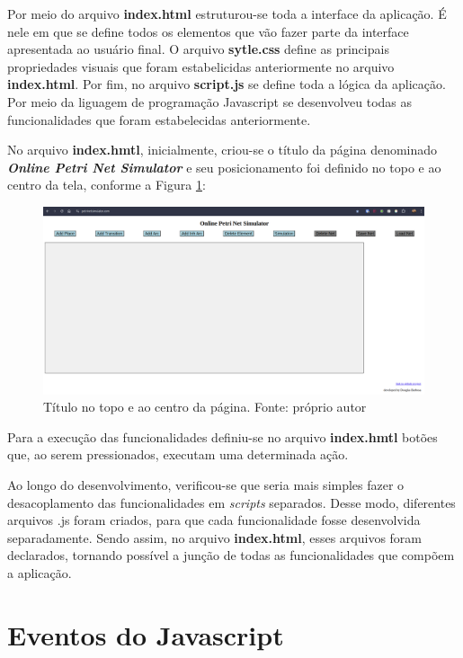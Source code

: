 \documentclass[
	12pt,				%
	openright,			%
	oneside,			%
	a4paper,			%
	english,			%
	brazil				%
	]{abntex2}
\theoremstyle{doispontos}
\begin{document}
Por meio do arquivo \textbf{index.html} estruturou-se toda a interface da aplicação. É nele em que se define todos os elementos que vão fazer parte da interface apresentada ao usuário final. O arquivo \textbf{sytle.css} define as principais propriedades visuais que foram estabelicidas anteriormente no arquivo \textbf{index.html}. Por fim, no arquivo \textbf{script.js} se define toda a lógica da aplicação. Por meio da liguagem de programação Javascript se desenvolveu todas as funcionalidades que foram estabelecidas anteriormente. 

No arquivo \textbf{index.hmtl}, inicialmente, criou-se o título da página denominado \textbf{\textit{Online Petri Net Simulator}} e seu posicionamento foi definido no topo e ao centro da tela, conforme a Figura \ref{fig:titulo_topo_centro}:

\begin{figure}[ht] 
	\centering
	\includegraphics[scale=0.3]{figuras/tela_inicial_titulo_topo_centro.png}
	\caption[Título no topo e ao centro da página]{Título no topo e ao centro da página. Fonte: próprio autor}
	\label{fig:titulo_topo_centro}
\end{figure}

Para a execução das funcionalidades definiu-se no arquivo \textbf{index.hmtl} botões que, ao serem pressionados, executam uma determinada ação. 

Ao longo do desenvolvimento, verificou-se que seria mais simples fazer o desacoplamento das funcionalidades em \textit{scripts} separados. Desse modo, diferentes arquivos .js foram criados, para que cada funcionalidade fosse desenvolvida separadamente. Sendo assim, no arquivo \textbf{index.html}, esses arquivos foram declarados, tornando possível a junção de todas as funcionalidades que compõem a aplicação. 

\section{Eventos do Javascript}
\end{document}
